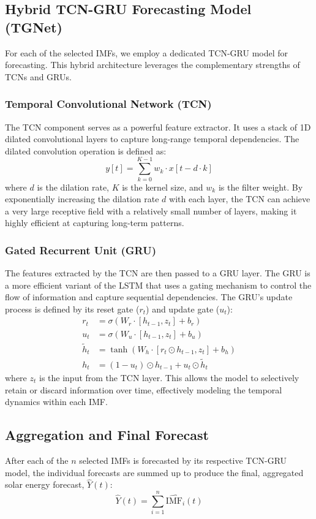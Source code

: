 \documentclass[conference]{IEEEtran}
\begin{document}
\subsection{Hybrid TCN-GRU Forecasting Model (TGNet)}
For each of the selected IMFs, we employ a dedicated TCN-GRU model for forecasting. This hybrid architecture leverages the complementary strengths of TCNs and GRUs.

\subsubsection{Temporal Convolutional Network (TCN)}
The TCN component serves as a powerful feature extractor. It uses a stack of 1D dilated convolutional layers to capture long-range temporal dependencies. The dilated convolution operation is defined as:
\begin{equation}
y[t] = \sum_{k=0}^{K-1} w_k \cdot x[t - d \cdot k]
\end{equation}
where $d$ is the dilation rate, $K$ is the kernel size, and $w_k$ is the filter weight. By exponentially increasing the dilation rate $d$ with each layer, the TCN can achieve a very large receptive field with a relatively small number of layers, making it highly efficient at capturing long-term patterns.

\subsubsection{Gated Recurrent Unit (GRU)}
The features extracted by the TCN are then passed to a GRU layer. The GRU is a more efficient variant of the LSTM that uses a gating mechanism to control the flow of information and capture sequential dependencies. The GRU's update process is defined by its reset gate ($r_t$) and update gate ($u_t$):
\begin{align}
r_t &= \sigma(W_r \cdot [h_{t-1}, z_t] + b_r) \\
u_t &= \sigma(W_u \cdot [h_{t-1}, z_t] + b_u) \\
\tilde{h}_t &= \tanh(W_h \cdot [r_t \odot h_{t-1}, z_t] + b_h) \\
h_t &= (1 - u_t) \odot h_{t-1} + u_t \odot \tilde{h}_t
\end{align}
where $z_t$ is the input from the TCN layer. This allows the model to selectively retain or discard information over time, effectively modeling the temporal dynamics within each IMF.

\subsection{Aggregation and Final Forecast}
After each of the $n$ selected IMFs is forecasted by its respective TCN-GRU model, the individual forecasts are summed up to produce the final, aggregated solar energy forecast, $\hat{Y}(t)$:
\begin{equation}
\hat{Y}(t) = \sum_{i=1}^{n} \widehat{\text{IMF}_i}(t)
\end{equation}
\end{document}
